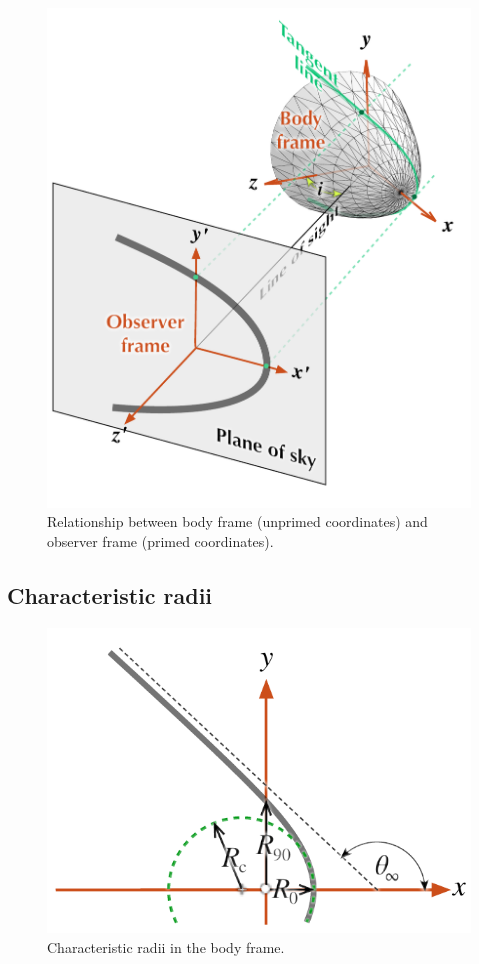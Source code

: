 \begin{figure}
  \centering
  \includegraphics[width=\linewidth]{figs/projection-pos}
  \caption{Relationship between body frame (unprimed coordinates) and
    observer frame (primed coordinates).}
  \label{fig:projection-pos}
\end{figure}


\subsection{Characteristic radii}
\label{sec:characteristic-radii}
\begin{figure}
  \centering
  \includegraphics[width=\linewidth]{figs/characteristic-radii}
  \caption{Characteristic radii in the body frame.}
  \label{fig:characteristic-radii}
\end{figure}



